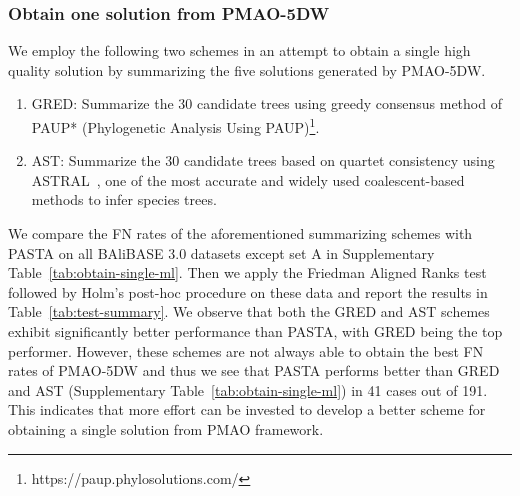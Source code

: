 \subsubsection{Obtain one solution from PMAO-5DW}
We employ the following two schemes in an attempt to obtain a single high quality solution by summarizing the five solutions generated by PMAO-5DW.
\begin{enumerate}
	\item GRED: Summarize the 30 candidate trees using greedy consensus method of PAUP* (Phylogenetic Analysis Using PAUP)\footnote{https://paup.phylosolutions.com/}.
	\item AST: Summarize the 30 candidate trees based on quartet consistency using ASTRAL~\cite{zhang2018astral}, one of the most accurate and widely used coalescent-based methods to infer species trees.
\end{enumerate}
We compare the FN rates of the aforementioned summarizing schemes with PASTA on all BAliBASE 3.0 datasets except set A in Supplementary Table~\ref{tab:obtain-single-ml}. Then we apply the Friedman Aligned Ranks test followed by Holm's post-hoc procedure on these data and report the results in Table~\ref{tab:test-summary}. We observe that both the GRED and AST schemes exhibit significantly better performance than PASTA, with GRED being the top performer. However, these schemes are not always able to obtain the best FN rates of PMAO-5DW and thus we see that PASTA performs better than GRED and AST (Supplementary Table~\ref{tab:obtain-single-ml}) in 41 cases out of 191. This indicates that more effort can be invested to develop a better scheme for obtaining a single solution from PMAO framework. 


